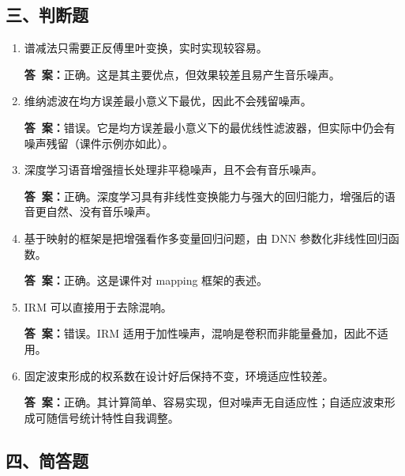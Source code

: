 \documentclass[10.5pt]{ctexart}
\newenvironment{qlist}
  {\begin{enumerate}[label={\sffamily\bfseries\color{accent}\arabic*.},leftmargin=2.4em,labelsep=0.55em,itemsep=0.62em,topsep=0.15em,parsep=0.3em,partopsep=0pt]}
  {\end{enumerate}}
\newcommand{\anslabel}{{\sffamily\bfseries\color{accent}答\ 案：}\hspace{0.35em}}
\newcommand{\ans}[1]{\par\vspace{2.15\baselineskip}\begin{ansbox}\anslabel #1\end{ansbox}}
\begin{document}
\subsection{三、判断题}

\begin{qlist}

\item 谱减法只需要正反傅里叶变换，实时实现较容易。
\ans{正确。这是其主要优点，但效果较差且易产生音乐噪声。}

\item 维纳滤波在均方误差最小意义下最优，因此不会残留噪声。
\ans{错误。它是均方误差最小意义下的最优线性滤波器，但实际中仍会有噪声残留（课件示例亦如此）。}

\item 深度学习语音增强擅长处理非平稳噪声，且不会有音乐噪声。
\ans{正确。深度学习具有非线性变换能力与强大的回归能力，增强后的语音更自然、没有音乐噪声。}

\item 基于映射的框架是把增强看作多变量回归问题，由 DNN 参数化非线性回归函数。
\ans{正确。这是课件对 mapping 框架的表述。}

\item IRM 可以直接用于去除混响。
\ans{错误。IRM 适用于加性噪声，混响是卷积而非能量叠加，因此不适用。}

\item 固定波束形成的权系数在设计好后保持不变，环境适应性较差。
\ans{正确。其计算简单、容易实现，但对噪声无自适应性；自适应波束形成可随信号统计特性自我调整。}

\end{qlist}

\subsection{四、简答题}
\end{document}
